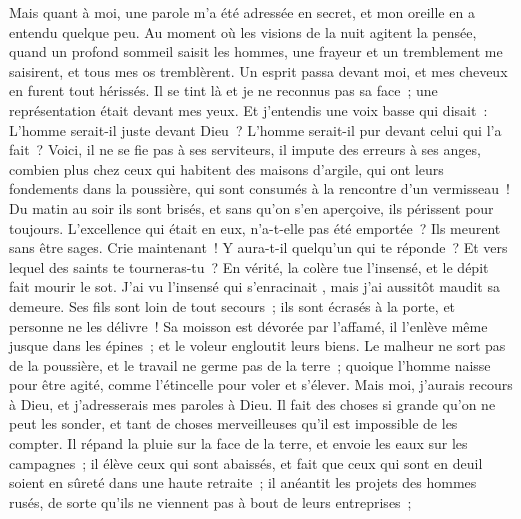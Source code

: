 \begin{multicols}{2}
Mais quant à moi, une parole m'a été adressée en secret, et mon oreille en a entendu quelque peu.
Au moment où les visions de la nuit agitent la pensée, quand un profond sommeil saisit les hommes,
une frayeur et un tremblement me saisirent, et tous mes os tremblèrent.
Un esprit passa devant moi, et mes cheveux en furent tout hérissés.
Il se tint là et je ne reconnus pas sa face~; une représentation était devant mes yeux. Et j'entendis une voix basse qui disait~:
L'homme serait-il juste devant Dieu~? L'homme serait-il pur devant celui qui l'a fait~?
Voici, il ne se fie pas à ses serviteurs, il impute des erreurs à ses anges,
combien plus chez ceux qui habitent des maisons d'argile, qui ont leurs fondements dans la poussière, qui sont consumés à la rencontre d'un vermisseau~!
Du matin au soir ils sont brisés, et sans qu'on s'en aperçoive, ils périssent pour toujours.
L'excellence qui était en eux, n'a-t-elle pas été emportée~? Ils meurent sans être sages.
\VerseOne{}Crie maintenant~! Y aura-t-il quelqu'un qui te réponde~? Et vers lequel des saints te tourneras-tu~?
En vérité, la colère tue l'insensé, et le dépit fait mourir le sot.
J'ai vu l'insensé qui s'enracinait , mais j'ai aussitôt maudit sa demeure.
Ses fils sont loin de tout secours~; ils sont écrasés à la porte, et personne ne les délivre~!
Sa moisson est dévorée par l'affamé, il l'enlève même jusque dans les épines~; et le voleur engloutit leurs biens.
Le malheur ne sort pas de la poussière, et le travail ne germe pas de la terre~;
quoique l'homme naisse pour être agité, comme l'étincelle pour voler et s'élever.
Mais moi, j'aurais recours à Dieu, et j'adresserais mes paroles à Dieu.
Il fait des choses si grande qu'on ne peut les sonder, et tant de choses merveilleuses qu'il est impossible de les compter.
Il répand la pluie sur la face de la terre, et envoie les eaux sur les campagnes~;
il élève ceux qui sont abaissés, et fait que ceux qui sont en deuil soient en sûreté dans une haute retraite~;
il anéantit les projets des hommes rusés, de sorte qu'ils ne viennent pas à bout de leurs entreprises~;

\end{multicols}
